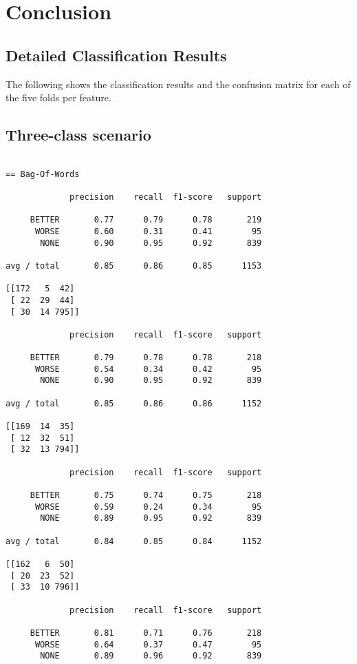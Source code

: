 \chapter{Conclusion}


\begin{appendices}
\chapter{Detailed Classification Results}
The following shows the classification results and the confusion matrix for each of the five folds per feature.

\section{Three-class scenario}
\begin{verbatim}

== Bag-Of-Words

             precision    recall  f1-score   support

     BETTER       0.77      0.79      0.78       219
      WORSE       0.60      0.31      0.41        95
       NONE       0.90      0.95      0.92       839

avg / total       0.85      0.86      0.85      1153

[[172   5  42]
 [ 22  29  44]
 [ 30  14 795]]
 
             precision    recall  f1-score   support

     BETTER       0.79      0.78      0.78       218
      WORSE       0.54      0.34      0.42        95
       NONE       0.90      0.95      0.92       839

avg / total       0.85      0.86      0.86      1152

[[169  14  35]
 [ 12  32  51]
 [ 32  13 794]]
 
             precision    recall  f1-score   support

     BETTER       0.75      0.74      0.75       218
      WORSE       0.59      0.24      0.34        95
       NONE       0.89      0.95      0.92       839

avg / total       0.84      0.85      0.84      1152

[[162   6  50]
 [ 20  23  52]
 [ 33  10 796]]
 
             precision    recall  f1-score   support

     BETTER       0.81      0.71      0.76       218
      WORSE       0.64      0.37      0.47        95
       NONE       0.89      0.96      0.92       839


\end{verbatim}
\end{appendices}
